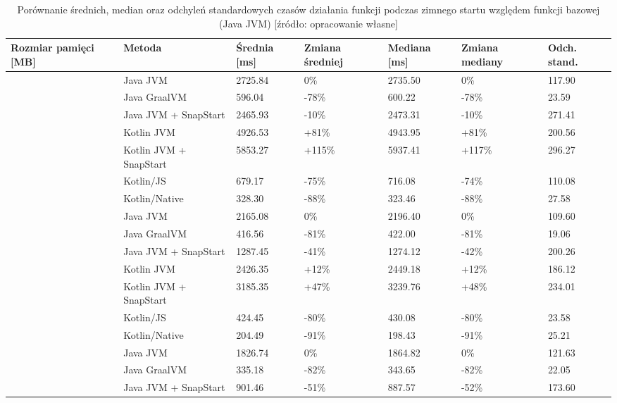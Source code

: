 \begin{table}[h!]
\centering
\caption{Porównanie średnich, median oraz odchyleń standardowych czasów działania funkcji podczas zimnego startu względem funkcji bazowej (Java JVM) [źródło: opracowanie własne]}
\small
\begin{tabular}{|>{\centering\arraybackslash}m{1.5cm}|l|p{1.5cm}|p{1.5cm}|p{1.5cm}|p{1.5cm}|p{1.5cm}|}
\toprule
Rozmiar pamięci [MB] & Metoda & Średnia [ms] & Zmiana średniej & Mediana [ms] & Zmiana mediany & Odch. stand. \\
\midrule
\multirow{7}{*}{128} & Java JVM & 2725.84 & \mbox{0\%} & 2735.50 & \mbox{0\%} & 117.90 \\
 & Java GraalVM & 596.04 & \mbox{-78\%} & 600.22 & \mbox{-78\%} & 23.59 \\
 & Java JVM + SnapStart & 2465.93 & \mbox{-10\%} & 2473.31 & \mbox{-10\%} & 271.41 \\
 & Kotlin JVM & 4926.53 & \mbox{+81\%} & 4943.95 & \mbox{+81\%} & 200.56 \\
 & Kotlin JVM + SnapStart & 5853.27 & \mbox{+115\%} & 5937.41 & \mbox{+117\%} & 296.27 \\
 & Kotlin/JS & 679.17 & \mbox{-75\%} & 716.08 & \mbox{-74\%} & 110.08 \\
 & Kotlin/Native & 328.30 & \mbox{-88\%} & 323.46 & \mbox{-88\%} & 27.58 \\
\midrule
\multirow{7}{*}{256} & Java JVM & 2165.08 & \mbox{0\%} & 2196.40 & \mbox{0\%} & 109.60 \\
 & Java GraalVM & 416.56 & \mbox{-81\%} & 422.00 & \mbox{-81\%} & 19.06 \\
 & Java JVM + SnapStart & 1287.45 & \mbox{-41\%} & 1274.12 & \mbox{-42\%} & 200.26 \\
 & Kotlin JVM & 2426.35 & \mbox{+12\%} & 2449.18 & \mbox{+12\%} & 186.12 \\
 & Kotlin JVM + SnapStart & 3185.35 & \mbox{+47\%} & 3239.76 & \mbox{+48\%} & 234.01 \\
 & Kotlin/JS & 424.45 & \mbox{-80\%} & 430.08 & \mbox{-80\%} & 23.58 \\
 & Kotlin/Native & 204.49 & \mbox{-91\%} & 198.43 & \mbox{-91\%} & 25.21 \\
\midrule
\multirow{7}{*}{512} & Java JVM & 1826.74 & \mbox{0\%} & 1864.82 & \mbox{0\%} & 121.63 \\
 & Java GraalVM & 335.18 & \mbox{-82\%} & 343.65 & \mbox{-82\%} & 22.05 \\
 & Java JVM + SnapStart & 901.46 & \mbox{-51\%} & 887.57 & \mbox{-52\%} & 173.60 \\

\end{tabular}
\end{table}
